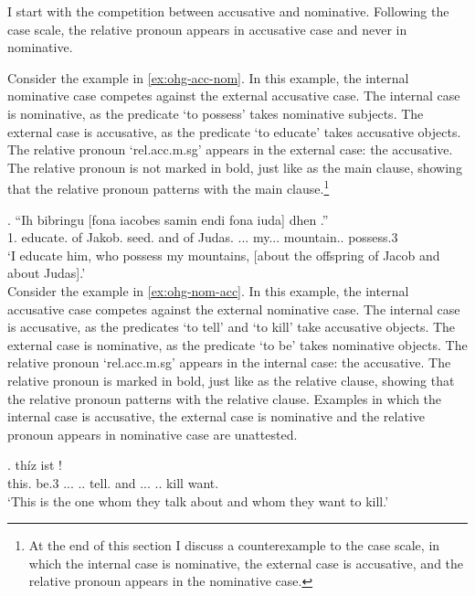 I start with the competition between accusative and nominative. Following the case scale, the relative pronoun appears in accusative case and never in nominative.

Consider the example in \ref{ex:ohg-acc-nom}. In this example, the internal nominative case competes against the external accusative case.
The internal case is nominative, as the predicate  `to possess' takes nominative subjects.
The external case is accusative, as the predicate  `to educate' takes accusative objects.
The relative pronoun  `\ac{rel}.\ac{acc}.\ac{m}.\ac{sg}' appears in the external case: the accusative. The relative pronoun is not marked in bold, just like as the main clause, showing that the relative pronoun patterns with the main clause.\footnote{
At the end of this section I discuss a counterexample to the case scale, in which the internal case is nominative, the external case is accusative, and the relative pronoun appears in the nominative case.
}


\exg. ``Ih bibringu [fona iacobes samin endi fona iuda] dhen   .''\\
1. {educate}.\scsub{[acc]} of Jakob. seed. and of Judas. ... my... mountain.. possess.3\scsub{[nom]}\\
`I educate him, who possess my mountains, [about the offspring of Jacob and about Judas].' \label{ex:ohg-acc-nom}\\

Consider the example in \ref{ex:ohg-nom-acc}. In this example, the internal accusative case competes against the external nominative case.
The internal case is accusative, as the predicates  `to tell' and  `to kill' take accusative objects.
The external case is nominative, as the predicate  `to be' takes nominative objects.
The relative pronoun  `\ac{rel}.\ac{acc}.\ac{m}.\ac{sg}' appears in the internal case: the accusative. The relative pronoun is marked in bold, just like as the relative clause, showing that the relative pronoun patterns with the relative clause.
Examples in which the internal case is accusative, the external case is nominative and the relative pronoun appears in nominative case are unattested.

\exg. thíz ist        !\\
this. be.3\scsub{[nom]} ... .. tell.\scsub{[acc]}
and ... .. kill\scsub{[acc]} want.\\
`This is the one whom they talk about and whom they want to kill.' \label{ex:ohg-nom-acc}

